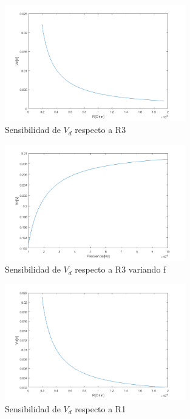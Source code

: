 \documentclass[../../main.tex]{subfiles}
\begin{document}
\begin{figure}[H]	
	\centering
	\includegraphics[width=0.7\textwidth]{fotos/r3r.png}
	\caption{Sensibilidad de $V_d$ respecto a R3}
\end{figure}

\begin{figure}[H]	
	\centering
	\includegraphics[width=0.7\textwidth]{fotos/r3f.png}
	\caption{Sensibilidad de $V_d$ respecto a R3 variando f}
\end{figure}


\begin{figure}[H]	
	\centering
	\includegraphics[width=0.7\textwidth]{fotos/r1r.png}
	\caption{Sensibilidad de $V_d$ respecto a R1}
\end{figure}
\end{document}
